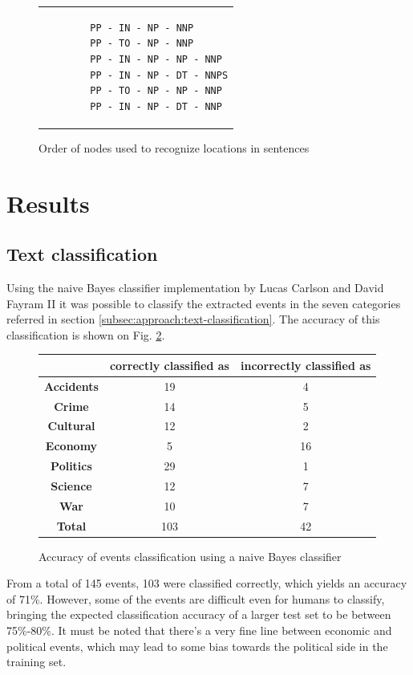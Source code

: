 \documentclass{llncs}
\begin{document}
\begin{figure}[h!]
	\centering
	\begin{tabular}{p{4cm}}
		\begin{verbatim}
		PP - IN - NP - NNP
		PP - TO - NP - NNP
		PP - IN - NP - NP - NNP
		PP - IN - NP - DT - NNPS
		PP - TO - NP - NP - NNP
		PP - IN - NP - DT - NNP
		\end{verbatim}
	\end{tabular}
	\caption{Order of nodes used to recognize locations in sentences}
	\label{fig:nodes-order}
\end{figure}

\section{Results}

\subsection{Text classification}

Using the naive Bayes classifier implementation by Lucas Carlson and David Fayram II\cite{classifier} it was possible to classify the extracted events in the seven categories referred in section \ref{subsec:approach:text-classification}. The accuracy of this classification is shown on Fig. \ref{fig:classifier-accuracy}.

\begin{figure}[h!]
	\centering
	\begin{tabular}{c|c|c}
	 & \textbf{correctly classified as} & \textbf{incorrectly classified as} \\
	\hline
	\textbf{Accidents} & 19 & 4 \\
	\textbf{Crime}     & 14 & 5 \\
	\textbf{Cultural}  & 12 & 2 \\
	\textbf{Economy}   & 5 & 16 \\
	\textbf{Politics}  & 29 & 1 \\
	\textbf{Science}   & 12 & 7 \\
	\textbf{War}       & 10 & 7 \\
	\hline
	\textbf{Total}     & 103 & 42 \\
	\end{tabular}
	\caption{Accuracy of events classification using a naive Bayes classifier}
	\label{fig:classifier-accuracy}
\end{figure}

From a total of 145 events, 103 were classified correctly, which yields an accuracy of 71\%. However, some of the events are difficult even for humans to classify, bringing the expected classification accuracy of a larger test set to be between 75\%-80\%. It must be noted that there's a very fine line between economic and political events, which may lead to some bias towards the political side in the training set.
\end{document}
